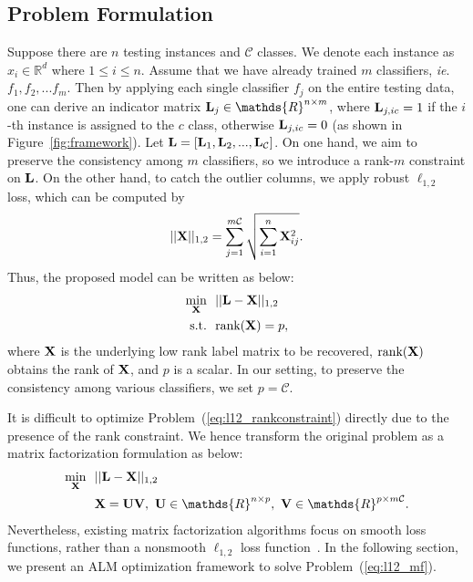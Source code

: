 \documentclass[letterpaper]{article}
\def\calC{{\mathcal{C}}}
\def\bL{{\bf L}}
\def\bU{{\bf U}}
\def\bV{{\bf V}}
\def\dsR{\mathds{R}}
\def\bX{{\bf X}}
\def\bX{{\bf X}}
\def\st{{\text{s.t.}}}
\def\ie{\emph{ie}}
\def\rank{{\text{rank}}}
\begin{document}
\subsection{Problem Formulation}

Suppose there are $n$ testing instances and $\calC$ classes.
We denote each instance as $x_i \in \dsR^{d}$ where $1 \leq i \leq n$.
Assume that we have already trained $m$ classifiers, \ie. $f_1, f_2, ... f_m$.
Then by applying each single classifier $f_j$ on the entire testing data, one can derive an indicator matrix $\bL_j \in \dsR^{n \times m}$, where $\bL_{j, ic} = 1$ if the $i$-th instance is assigned to the $c$ class, otherwise $\bL_{j, ic} = 0$ (as shown in Figure~\ref{fig:framework}).
Let $\bL = [ \bL_1, \bL_2, ..., \bL_\calC ]$.
On one hand, we aim to preserve the consistency among $m$ classifiers, so we introduce a rank-$m$ constraint on $\bL$.
On the other hand, to catch the outlier columns, we apply robust $\ell_{1, 2}$ loss, which can be computed by
$$ || \bX ||_{1,2} = \sum_{j = 1}^{m\calC} \sqrt{ \sum_{i = 1}^{n} \bX_{ij}^2 } . $$
Thus, the proposed model can be written as below:
\begin{align}\label{eq:l12_rankconstraint}
  \min_{\bX} ~&~ || \bL - \bX ||_{1,2}    \nonumber \\
  \st ~&~ \rank(\bX) = p   ,
\end{align}
\noindent
where $\bX$ is the underlying low rank label matrix to be recovered, $\rank(\bX)$ obtains the rank of $\bX$,
and $p$ is a scalar.
In our setting, to preserve the consistency among various classifiers, we set $p = \calC$.



It is difficult to optimize Problem~(\ref{eq:l12_rankconstraint}) directly due to the presence of the rank constraint.
We hence transform the original problem as a matrix factorization formulation as below:
\begin{align}\label{eq:l12_mf}
  \min_{\bX} ~&~ || \bL - \bX ||_{1,2}   \nonumber \\
             ~&~ \bX = \bU \bV,~\bU \in \dsR^{n \times p},~\bV \in \dsR^{p \times m\calC}  .
\end{align}
\noindent
Nevertheless, existing matrix factorization algorithms focus on smooth loss functions, rather than a nonsmooth $\ell_{1,2}$ loss function~\cite{tanicml2014riemannian,vandereycken2013lowrank,Wen2012,ngonips2012scaled,rtrmc2011boumal}.
In the following section, we present an ALM optimization framework to solve Problem~(\ref{eq:l12_mf}).
\end{document}
